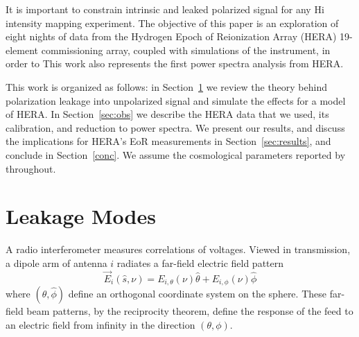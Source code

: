 \documentclass[twocolumn, trackchanges]{aastex61}
\begin{document}
It is important to constrain intrinsic and leaked polarized signal for any {\sc Hi} intensity mapping experiment. The objective of this paper is an exploration of eight nights of data from the Hydrogen Epoch of Reionization Array (HERA) 19-element commissioning array, coupled with simulations of the instrument, in order to  
This work also represents the first power spectra analysis from HERA. 

This work is organized as follows: in Section~\ref{sec:leak} we review the theory behind polarization leakage into unpolarized signal and simulate the effects  for a model of HERA. In Section~\ref{sec:obs} we describe the HERA data that we used, its calibration, and reduction to power spectra. We present our results, and discuss the implications for HERA's EoR measurements in Section~\ref{sec:results}, and conclude in Section~\ref{conc}. We assume the cosmological parameters reported by \cite{Planck.16} throughout.

\section{Leakage Modes}
\label{sec:leak}

A radio interferometer measures correlations of voltages. Viewed in transmission, a dipole arm of antenna $i$ radiates a far-field electric field pattern
\begin{equation}
\vec{E}_{i}(\hat{s}, \nu) = E_{i,\theta}(\nu)\hat{\theta} + E_{i,\phi}(\nu)\hat{\phi}
\end{equation}
where $(\hat{\theta},\hat{\phi})$ define an orthogonal coordinate system on the sphere. These far-field beam patterns, by the reciprocity theorem, define the response of the feed to an electric field from infinity in the direction $(\theta,\phi)$. 
\end{document}
